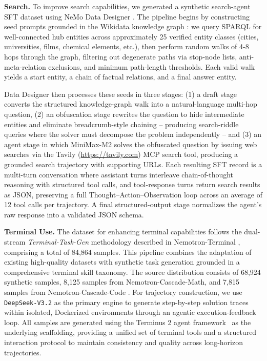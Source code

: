 \textbf{Search.}
To improve search capabilities, we generated a synthetic search-agent SFT dataset using NeMo Data Designer \citep{nemo-data-designer}. The pipeline begins by constructing seed prompts grounded in the Wikidata knowledge graph \citep{vrandecic2014wikidata}: we query SPARQL \citep{sparql2013} for well-connected hub entities across approximately 25 verified entity classes (cities, universities, films, chemical elements, etc.), then perform random walks of 4-8 hops through the graph, filtering out degenerate paths via stop-node lists, anti-meta-relation exclusions, and minimum path-length thresholds. Each valid walk yields a start entity, a chain of factual relations, and a final answer entity.

Data Designer then processes these seeds in three stages: (1) a draft stage converts the structured knowledge-graph walk into a natural-language multi-hop question, (2) an obfuscation stage rewrites the question to hide intermediate entities and eliminate breadcrumb-style chaining -- producing search-riddle queries where the solver must decompose the problem independently -- and (3) an agent stage in which MiniMax-M2 \citep{minimax2025m2} solves the obfuscated question by issuing web searches via the Tavily (\url{https://tavily.com}) MCP search tool, producing a grounded search trajectory with supporting URLs. Each resulting SFT record is a multi-turn conversation where assistant turns interleave chain-of-thought reasoning with structured tool calls, and tool-response turns return search results as JSON, preserving a full Thought--Action--Observation loop across an average of 12 tool calls per trajectory. A final structured-output stage normalizes the agent's raw response into a validated JSON schema. 


\textbf{Terminal Use.}
The dataset for enhancing terminal capabilities follows the dual-stream \textit{Terminal-Task-Gen} methodology described in Nemotron-Terminal \citep{pi2026dataengineeringscalingllm}, comprising a total of 84,864 samples. This pipeline combines the adaptation of existing high-quality datasets with synthetic task generation grounded in a comprehensive terminal skill taxonomy. The source distribution consists of 68,924 synthetic samples, 8,125 samples from Nemotron-Cascade-Math, and 7,815 samples from Nemotron-Cascade-Code \citep{wang2025nemotroncascadescalingcascadedreinforcement}. For trajectory construction, we use \texttt{DeepSeek-V3.2} \citep{deepseekai2024deepseekv32} as the primary engine to generate step-by-step solution traces within isolated, Dockerized environments through an agentic execution-feedback loop. All samples are generated using the Terminus 2 agent framework~\citep{merrill2026terminalbenchbenchmarkingagentshard} as the underlying scaffolding, providing a unified set of terminal tools and a structured interaction protocol to maintain consistency and quality across long-horizon trajectories.

